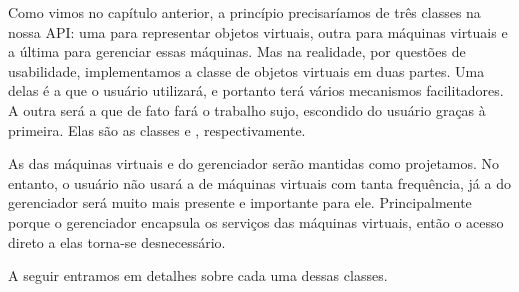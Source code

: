   Como vimos no capítulo anterior, a princípio precisaríamos de três classes
  na nossa API: uma para representar objetos virtuais, outra para máquinas virtuais
  e a última para gerenciar essas máquinas. Mas na realidade, por questões de
  usabilidade, implementamos a classe de objetos virtuais em duas partes. Uma
  delas é a que o usuário utilizará, e portanto terá vários mecanismos facilitadores.
  A outra será a que de fato fará o trabalho sujo, escondido do usuário graças
  à primeira. Elas são as classes \VObj{} e \VData{}, respectivamente.
  
  As das máquinas virtuais e do gerenciador serão mantidas como projetamos. No
  entanto, o usuário não usará a de máquinas virtuais com tanta frequência, já a
  do gerenciador será muito mais presente e importante para ele. Principalmente
  porque o gerenciador encapsula os serviços das máquinas virtuais, então o
  acesso direto a elas torna-se desnecessário.
  
  A seguir entramos em detalhes sobre cada uma dessas classes.
  

